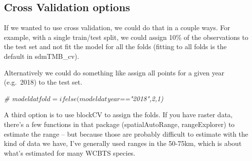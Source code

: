 \documentclass[
]{article}
\newenvironment{Shaded}{\begin{snugshade}}{\end{snugshade}}
\newcommand{\CommentTok}[1]{\textcolor[rgb]{0.56,0.35,0.01}{\textit{#1}}}
\newcommand{\DataTypeTok}[1]{\textcolor[rgb]{0.13,0.29,0.53}{#1}}
\newcommand{\DecValTok}[1]{\textcolor[rgb]{0.00,0.00,0.81}{#1}}
\newcommand{\FloatTok}[1]{\textcolor[rgb]{0.00,0.00,0.81}{#1}}
\newcommand{\KeywordTok}[1]{\textcolor[rgb]{0.13,0.29,0.53}{\textbf{#1}}}
\newcommand{\NormalTok}[1]{#1}
\newcommand{\OperatorTok}[1]{\textcolor[rgb]{0.81,0.36,0.00}{\textbf{#1}}}
\newcommand{\OtherTok}[1]{\textcolor[rgb]{0.56,0.35,0.01}{#1}}
\newcommand{\StringTok}[1]{\textcolor[rgb]{0.31,0.60,0.02}{#1}}
\begin{document}
\hypertarget{cross-validation-options}{%
\subsection{Cross Validation options}\label{cross-validation-options}}

If we wanted to use cross validation, we could do that in a couple ways.
For example, with a single train/test split, we could assign 10\% of the
observations to the test set and not fit the model for all the folds
(fitting to all folds is the default in sdmTMB\_cv).

\begin{Shaded}
\end{Shaded}

Alternatively we could do something like assign all points for a given
year (e.g.~2018) to the test set.

\begin{Shaded}
\begin{Highlighting}[]
\CommentTok{# modeldat$fold = ifelse(modeldat$year=="2018",2,1)}
\end{Highlighting}
\end{Shaded}

A third option is to use blockCV to assign the folds. If you have raster
data, there's a few functions in that package (spatialAutoRange,
rangeExplorer) to estimate the range -- but because those are probably
difficult to estimate with the kind of data we have, I've generally used
ranges in the 50-75km, which is about what's estimated for many WCBTS
species.
\end{document}
